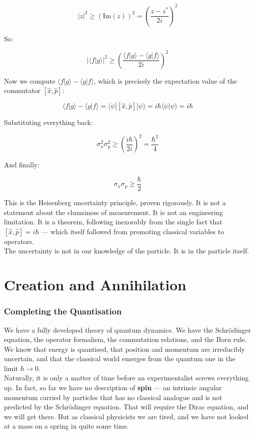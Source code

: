 \documentclass[krantz1,ChapterTOCs]{krantz}
\begin{document}
$$|z|^2 \geq \left(\mathrm{Im}(z)\right)^2 
= \left(\frac{z - z^*}{2i}\right)^2$$

So:

$$|\langle f|g\rangle|^2 \geq 
\left(\frac{\langle f|g\rangle - \langle g|f\rangle}{2i}\right)^2$$

Now we compute $\langle f|g\rangle - \langle g|f\rangle$, which is 
precisely the expectation value of the commutator $[\hat{x}, \hat{p}]$:

$$\langle f|g\rangle - \langle g|f\rangle 
= \langle\psi|[\hat{x},\hat{p}]|\psi\rangle 
= i\hbar\langle\psi|\psi\rangle = i\hbar$$

Substituting everything back:

$$\sigma_x^2\sigma_p^2 \geq 
\left(\frac{i\hbar}{2i}\right)^2 = \frac{\hbar^2}{4}$$

And finally:

$$\boxed{\sigma_x\sigma_p \geq \frac{\hbar}{2}}$$

This is the Heisenberg uncertainty principle, proven rigorously. 
It is not a statement about the clumsiness of measurement. It is 
not an engineering limitation. It is a theorem, following 
inexorably from the single fact that $[\hat{x}, \hat{p}] = i\hbar$ 
--- which itself followed from promoting classical variables to 
operators.\\

The uncertainty is not in our knowledge of the particle. It is 
in the particle itself.\\

\part{Creation and Annihilation}

\section*{Completing the Quantisation}

We have a fully developed theory of quantum dynamics. We have the 
Schr\"{o}dinger equation, the operator formalism, the commutation 
relations, and the Born rule. We know that energy is quantised, 
that position and momentum are irreducibly uncertain, and that the 
classical world emerges from the quantum one in the limit 
$\hbar \to 0$.\\

Naturally, it is only a matter of time before an experimentalist 
screws everything up. In fact, so far we have no description of 
\textbf{spin} --- an intrinsic angular momentum carried by 
particles that has no classical analogue and is not predicted by 
the Schr\"{o}dinger equation. That will require the Dirac equation, 
and we will get there. But as classical physicists we are tired, 
and we have not looked at a mass on a spring in quite some time.\\
\end{document}
